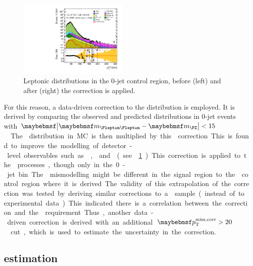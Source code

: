 \begin{figure}[p]
	\hfill
	\includegraphics[width=0.48\textwidth]{tex/backgrounds/ZpT-on/eemm_CutZControl_0jet_lepPtLead_mh125_log}
	\caption{Leptonic distributions in the 0-jet \DYll control region, before (left) and 
	after (right) the \ptZ correction is applied.}
	\label{fig:dy:ptZ_reweight}
\end{figure}

For this reason, a data-driven correction to the \ptZ distribution is employed. It is 
derived by comparing the observed and predicted \ptll distributions in 0-jet \mmch events 
with \unit{$\mods{\mll - \mZ} < 15$}{\GeV}. The \ptZ distribution in MC is then multiplied 
by this \ptll correction. This is found to improve the modelling of detector-level 
observables such as \ptll, \dphill and \ptleadlep (see \Figure~\ref{fig:dy:ptZ_reweight}). 
This correction is applied to the \HepProcess{\DY \HepTo \Pe\Pe/\Pmu\Pmu/\Ptau\Ptau} 
processes, though only in the 0-jet bin.

The \ptZ mismodelling might be different in the signal region to the \PZ control region 
where it is derived. The validity of this extrapolation of the correction was tested by 
deriving similar corrections to a \sherpa sample (instead of to experimental data). This 
indicated there is a correlation between the correction and the \met requirement. Thus, 
another data-driven correction is derived with an additional 
\unit{$\corrtrackmet > 20$}{\GeV} cut, which is used to estimate the uncertainty in the 
correction.



\subsection{\DYtt estimation}
\label{sec:dy:tautau}

